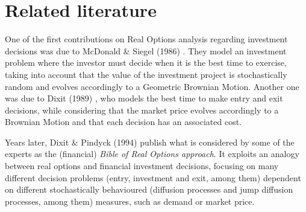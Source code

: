 
\section{Related literature}


One of the first contributions on Real Options analysis regarding investment decisions was due to McDonald \& Siegel (1986)  \cite{siegel}. They model an investment problem where the investor must decide when it is the best time to exercise, taking into account that the value of the investment project is stochastically random and evolves accordingly to a Geometric Brownian Motion. Another one was due to Dixit (1989) \cite{dixit_alone}, who models the best time to make entry and exit decisions, while considering that the market price evolves accordingly to a Brownian Motion and that each decision has an associated cost.

Years later, Dixit \& Pindyck (1994) \cite{dixit:book} publish what is considered by some of the experts as the (financial) \textit{Bible of Real Options approach}. It exploits an analogy between real options and financial investment decisions, focusing on many different decision problems (entry, investment and exit, among them) dependent on different stochastically behavioured (diffusion processes and jump diffusion processes, among them) measures, such as demand or market price.


